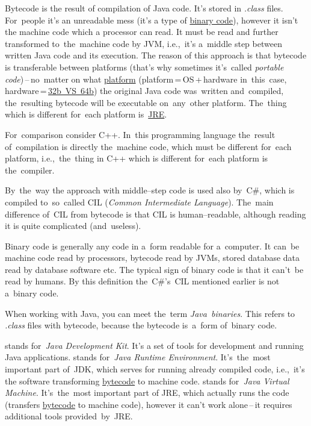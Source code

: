 \label{java}

\label{bytecode}
Bytecode is the result of compilation of Java code.
It's stored in \textit{.class} files.
For~people it's an unreadable mess (it's a type of \hyperref[bytecodebinarycode]{binary code}), however it isn't the machine code which a processor can read.
It must be read and further transformed to~the~machine code by JVM, i.e.,~it's a~middle step between written Java code and its execution.
The reason of this approach is that bytecode is transferable between platforms (that's why sometimes it's~called \textit{portable code})\,--\,no~matter on what \hyperref[platform]{platform} (platform\,=\,OS\,+\,hardware in~this~case, hardware\,=\,\hyperref[32bvs64b]{32b~VS~64b}) the original Java code was~written and~compiled, the~resulting bytecode will be executable on~any~other platform.
The~thing which is different for~each platform is~\hyperref[jdkjrejvm]{JRE}.

For~comparison consider C++.
In~this programming language the~result of~compilation is directly the~machine code, which must be different for~each platform, i.e.,~the~thing in C++ which is different for~each platform is the~compiler.

By~the~way the approach with middle--step code is used also by~C\#, which is compiled to~so~called CIL (\textit{Common Intermediate Language}).
The~main difference of~CIL from bytecode is that CIL is human--readable, although reading it is quite complicated (and~useless).

\label{bytecodebinarycode}
Binary code is generally any code in a~form readable for a~computer.
It can~be machine code read by processors, bytecode read by JVMs, stored database data read by database software etc.
The typical sign of binary code is that it can't~be read by humans.
By this definition the~C\#'s~CIL mentioned earlier is not a~binary code.

When working with Java, you can meet the~term \textit{Java~binaries}.
This refers to \textit{.class} files with bytecode, because the bytecode is~a~form of~binary code.
\newpage

\label{jdkjrejvm}
\begin{itemize}
     stands for~\textit{Java Development Kit}.
            It's a set of tools for development and running Java applications.
     stands for~\textit{Java Runtime Environment}.
            It's~the~most important part of~JDK, which serves for running already compiled code, i.e.,~it's the software transforming \hyperref[bytecode]{bytecode} to machine code.
     stands for~\textit{Java Virtual Machine}.
            It's~the~most important part of JRE, which actually runs the code (transfers \hyperref[bytecode]{bytecode} to machine code), however it can't work alone\,--\,it requires additional tools provided~by~JRE\@.
\end{itemize}

